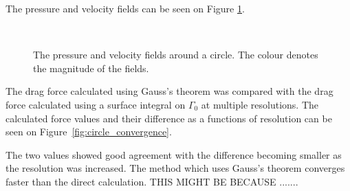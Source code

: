 \documentclass[12pt, a4paper]{article}
\begin{document}
The pressure and velocity fields can be seen on Figure \ref{fig_circle}.
\begin{figure}[htbp]
    \centering
     \\
    \caption{The pressure and velocity fields around a circle. The colour denotes the magnitude of the fields.}
    \label{fig_circle}
\end{figure}

The drag force calculated using Gauss's theorem was compared with the drag force calculated using a surface integral on $\Gamma_0$ at multiple resolutions. The calculated force values and their difference as a functions of resolution can be seen on Figure~\ref{fig:circle_convergence}.

The two values showed good agreement with the difference becoming smaller as the resolution was increased. The method which uses Gauss's theorem converges faster than the direct calculation. THIS MIGHT BE BECAUSE .......
\end{document}
